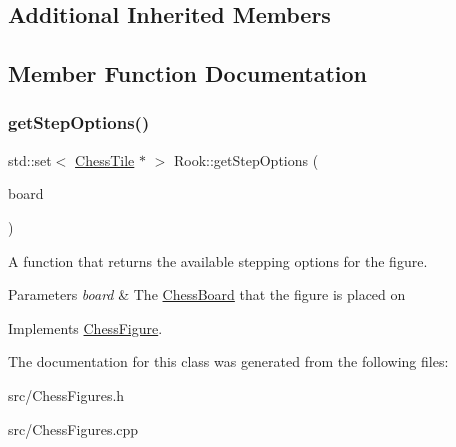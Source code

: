\subsection*{Additional Inherited Members}


\subsection{Member Function Documentation}
\mbox{\label{classRook_a466f48269ca58857c2a1ab1ab92c91f8}} 
\subsubsection{\texorpdfstring{get\+Step\+Options()}{getStepOptions()}}
{\footnotesize\ttfamily std\+::set$<$ \mbox{\hyperlink{classChessTile}{Chess\+Tile}} $\ast$ $>$ Rook\+::get\+Step\+Options (\begin{DoxyParamCaption}\item[{\mbox{\hyperlink{classChessBoard}{Chess\+Board}} \&}]{board }\end{DoxyParamCaption})\hspace{0.3cm}{\ttfamily [virtual]}}



A function that returns the available stepping options for the figure. 


\begin{DoxyParams}{Parameters}
{\em board} & The \mbox{\hyperlink{classChessBoard}{Chess\+Board}} that the figure is placed on \\
\hline
\end{DoxyParams}


Implements \mbox{\hyperlink{classChessFigure_ae78d52e35c4ea926f492d211c69758bd}{Chess\+Figure}}.



The documentation for this class was generated from the following files\+:\begin{DoxyCompactItemize}
\item 
src/Chess\+Figures.\+h\item 
src/Chess\+Figures.\+cpp\end{DoxyCompactItemize}

